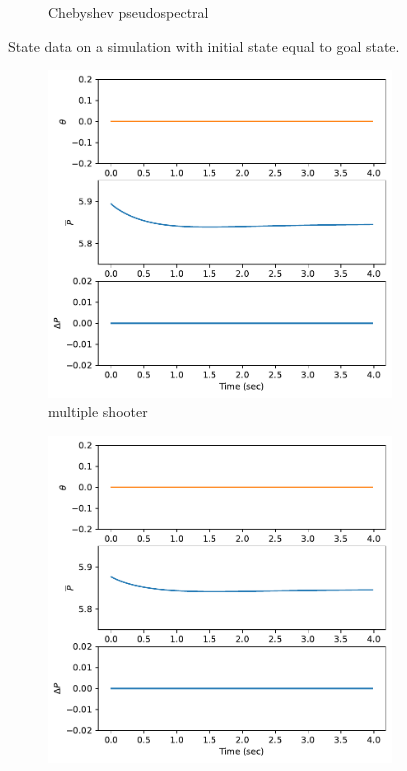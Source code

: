 \documentclass[]{article}
\begin{document}
\begin{figure}[H]
\begin{subfigure}[b]{0.3\textwidth}
		\caption{Chebyshev pseudospectral}
	\end{subfigure}
	\caption{State data on a simulation with initial state equal to goal state.}
	\label{fig:statehover}
\end{figure}

\begin{figure}[H]
	\centering
	\begin{subfigure}[b]{0.3\textwidth}
		\centering
		\includegraphics[width=\textwidth]{figures/controlhover6.pdf}
		\caption{multiple shooter}
	\end{subfigure}
	\begin{subfigure}[b]{0.3\textwidth}
		\centering
		\includegraphics[width=\textwidth]{figures/controlhover4.pdf}

\end{subfigure}
\end{figure}
\end{document}
